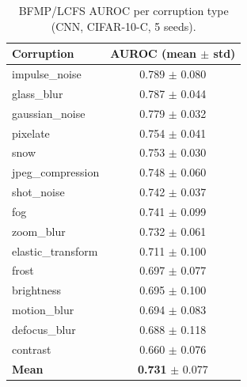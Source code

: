 \begin{table}[t]
\centering
\caption{BFMP/LCFS AUROC per corruption type (CNN, CIFAR-10-C, 5 seeds).}
\label{tab:per_corruption}
\begin{tabular}{lc}
\toprule
Corruption & AUROC (mean $\pm$ std) \\
\midrule
impulse\_noise & 0.789 $\pm$ 0.080 \\
glass\_blur & 0.787 $\pm$ 0.044 \\
gaussian\_noise & 0.779 $\pm$ 0.032 \\
pixelate & 0.754 $\pm$ 0.041 \\
snow & 0.753 $\pm$ 0.030 \\
jpeg\_compression & 0.748 $\pm$ 0.060 \\
shot\_noise & 0.742 $\pm$ 0.037 \\
fog & 0.741 $\pm$ 0.099 \\
zoom\_blur & 0.732 $\pm$ 0.061 \\
elastic\_transform & 0.711 $\pm$ 0.100 \\
frost & 0.697 $\pm$ 0.077 \\
brightness & 0.695 $\pm$ 0.100 \\
motion\_blur & 0.694 $\pm$ 0.083 \\
defocus\_blur & 0.688 $\pm$ 0.118 \\
contrast & 0.660 $\pm$ 0.076 \\
\midrule
\textbf{Mean} & \textbf{0.731} $\pm$ 0.077 \\
\bottomrule
\end{tabular}
\end{table}